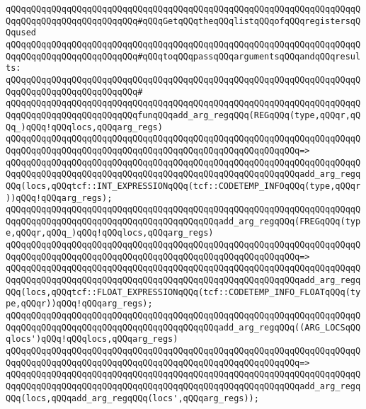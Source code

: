 \newline
\newline
\verb|qQQqqQQqqQQqqQQqqQQqqQQqqQQqqQQqqQQqqQQqqQQqqQQqqQQqqQQqqQQqqQQqqQQqqQQqqQQqqQQqqQQqqQQqqQQqqQQq#qQQqGetqQQqtheqQQqlistqQQqofqQQqregistersqQQqused|\newline
\verb|qQQqqQQqqQQqqQQqqQQqqQQqqQQqqQQqqQQqqQQqqQQqqQQqqQQqqQQqqQQqqQQqqQQqqQQqqQQqqQQqqQQqqQQqqQQqqQQq#qQQqtoqQQqpassqQQqargumentsqQQqandqQQqresults:|\newline
\verb|qQQqqQQqqQQqqQQqqQQqqQQqqQQqqQQqqQQqqQQqqQQqqQQqqQQqqQQqqQQqqQQqqQQqqQQqqQQqqQQqqQQqqQQqqQQqqQQq#|\newline
\verb|qQQqqQQqqQQqqQQqqQQqqQQqqQQqqQQqqQQqqQQqqQQqqQQqqQQqqQQqqQQqqQQqqQQqqQQqqQQqqQQqqQQqqQQqqQQqqQQqfunqQQqadd_arg_regqQQq(REGqQQq(type,qQQqr,qQQq_)qQQq!qQQqlocs,qQQqarg_regs)|\newline
\verb|qQQqqQQqqQQqqQQqqQQqqQQqqQQqqQQqqQQqqQQqqQQqqQQqqQQqqQQqqQQqqQQqqQQqqQQqqQQqqQQqqQQqqQQqqQQqqQQqqQQqqQQqqQQqqQQqqQQqqQQqqQQqqQQq=>|\newline
\verb|qQQqqQQqqQQqqQQqqQQqqQQqqQQqqQQqqQQqqQQqqQQqqQQqqQQqqQQqqQQqqQQqqQQqqQQqqQQqqQQqqQQqqQQqqQQqqQQqqQQqqQQqqQQqqQQqqQQqqQQqqQQqqQQqadd_arg_regqQQq(locs,qQQqtcf::INT_EXPRESSIONqQQq(tcf::CODETEMP_INFOqQQq(type,qQQqr))qQQq!qQQqarg_regs);|\newline
\newline
\verb|qQQqqQQqqQQqqQQqqQQqqQQqqQQqqQQqqQQqqQQqqQQqqQQqqQQqqQQqqQQqqQQqqQQqqQQqqQQqqQQqqQQqqQQqqQQqqQQqqQQqqQQqqQQqqQQqadd_arg_regqQQq(FREGqQQq(type,qQQqr,qQQq_)qQQq!qQQqlocs,qQQqarg_regs)|\newline
\verb|qQQqqQQqqQQqqQQqqQQqqQQqqQQqqQQqqQQqqQQqqQQqqQQqqQQqqQQqqQQqqQQqqQQqqQQqqQQqqQQqqQQqqQQqqQQqqQQqqQQqqQQqqQQqqQQqqQQqqQQqqQQqqQQq=>|\newline
\verb|qQQqqQQqqQQqqQQqqQQqqQQqqQQqqQQqqQQqqQQqqQQqqQQqqQQqqQQqqQQqqQQqqQQqqQQqqQQqqQQqqQQqqQQqqQQqqQQqqQQqqQQqqQQqqQQqqQQqqQQqqQQqqQQqadd_arg_regqQQq(locs,qQQqtcf::FLOAT_EXPRESSIONqQQq(tcf::CODETEMP_INFO_FLOATqQQq(type,qQQqr))qQQq!qQQqarg_regs);|\newline
\newline
\verb|qQQqqQQqqQQqqQQqqQQqqQQqqQQqqQQqqQQqqQQqqQQqqQQqqQQqqQQqqQQqqQQqqQQqqQQqqQQqqQQqqQQqqQQqqQQqqQQqqQQqqQQqqQQqqQQqadd_arg_regqQQq((ARG_LOCSqQQqlocs')qQQq!qQQqlocs,qQQqarg_regs)|\newline
\verb|qQQqqQQqqQQqqQQqqQQqqQQqqQQqqQQqqQQqqQQqqQQqqQQqqQQqqQQqqQQqqQQqqQQqqQQqqQQqqQQqqQQqqQQqqQQqqQQqqQQqqQQqqQQqqQQqqQQqqQQqqQQqqQQq=>|\newline
\verb|qQQqqQQqqQQqqQQqqQQqqQQqqQQqqQQqqQQqqQQqqQQqqQQqqQQqqQQqqQQqqQQqqQQqqQQqqQQqqQQqqQQqqQQqqQQqqQQqqQQqqQQqqQQqqQQqqQQqqQQqqQQqqQQqadd_arg_regqQQq(locs,qQQqadd_arg_regqQQq(locs',qQQqarg_regs));|\newline
